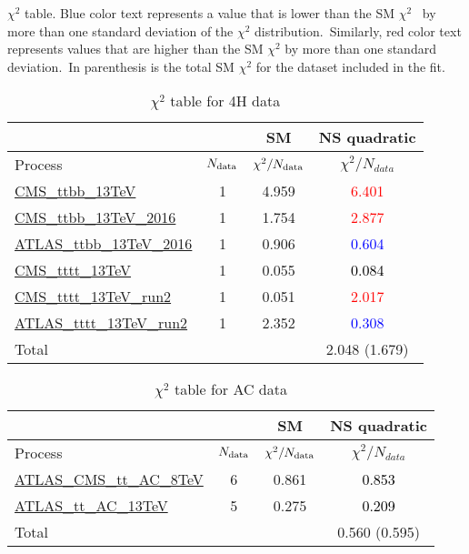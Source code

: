 \documentclass{article}
\begin{document}
$\chi^2$ table. Blue color text represents a value that is lower than the SM $\chi^2$ \
            by more than one standard deviation of the $\chi^2$ distribution.\
            Similarly, red color text represents values that are higher than the SM $\chi^2$ by more than one standard deviation.\
            In parenthesis is the total SM $\chi^2$ for the dataset included in the fit. \\
\begin{table}[H]
\centering
\begin{tabular}{|l|c|c|c|}
\hline
 \multicolumn{2}{|c|}{} & SM& NS quadratic\\ \hline
Process & $N_{\rm data}$ & $\chi^ 2/N_{\rm data}$& $\chi^ 2/N_{data}$\\ \hline
\href{https://arxiv.org/abs/1705.10141}{CMS_ttbb_13TeV} & 1 & 4.959 & \textcolor{red}{6.401} \\ \hline
\href{https://arxiv.org/abs/1909.05306}{CMS_ttbb_13TeV_2016} & 1 & 1.754 & \textcolor{red}{2.877} \\ \hline
\href{https://arxiv.org/abs/1811.12113}{ATLAS_ttbb_13TeV_2016} & 1 & 0.906 & \textcolor{blue}{0.604} \\ \hline
\href{https://arxiv.org/abs/1710.10614}{CMS_tttt_13TeV} & 1 & 0.055 & \textcolor{black}{0.084} \\ \hline
\href{https://arxiv.org/abs/1908.06463}{CMS_tttt_13TeV_run2} & 1 & 0.051 & \textcolor{red}{2.017} \\ \hline
\href{https://arxiv.org/abs/2007.14858}{ATLAS_tttt_13TeV_run2} & 1 & 2.352 & \textcolor{blue}{0.308} \\ \hline
\hline Total & &  & 2.048 (1.679) \\ \hline
\end{tabular}
\caption{$\chi^2$ table for 4H data}
\end{table}
\begin{table}[H]
\centering
\begin{tabular}{|l|c|c|c|}
\hline
 \multicolumn{2}{|c|}{} & SM& NS quadratic\\ \hline
Process & $N_{\rm data}$ & $\chi^ 2/N_{\rm data}$& $\chi^ 2/N_{data}$\\ \hline
\href{https://arxiv.org/abs/1709.05327}{ATLAS_CMS_tt_AC_8TeV} & 6 & 0.861 & \textcolor{black}{0.853} \\ \hline
\href{https://cds.cern.ch/record/2682109}{ATLAS_tt_AC_13TeV} & 5 & 0.275 & \textcolor{black}{0.209} \\ \hline
\hline Total & &  & 0.560 (0.595) \\ \hline
\end{tabular}
\caption{$\chi^2$ table for AC data}
\end{table}
\end{document}
